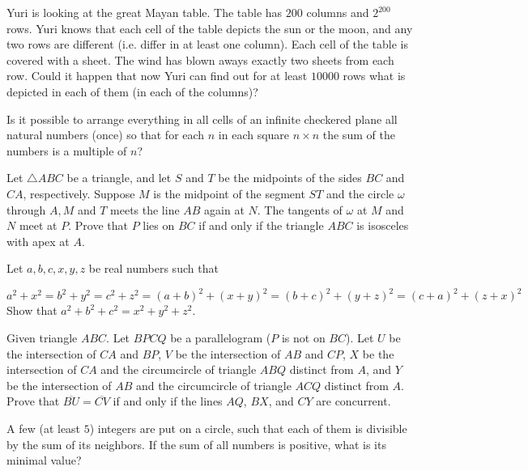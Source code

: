 \documentclass[11pt]{scrartcl}
\begin{document}
\begin{problem}[825542457780626]
Yuri is looking at the great Mayan table. The table has $200$ columns and $2^{200}$ rows. Yuri knows that each cell of the table depicts the sun or the moon, and any two rows are different (i.e. differ in at least one column). Each cell of the table is covered with a sheet. The wind has blown aways exactly two sheets from each row. Could it happen that now Yuri can find out for at least $10000$ rows what is depicted in each of them (in each of the columns)?
\end{problem}
\begin{problem}[3048608408918882691]
	Is it possible to arrange everything in all cells of an infinite checkered plane all natural numbers (once) so that for each $n$ in each square $n \times n$ the sum of the numbers is a multiple of $n$?
\end{problem}
\begin{problem}[8639636622304457736]
Let $\triangle ABC$ be a triangle, and let $S$ and $T$ be the midpoints of the sides $BC$ and $CA$, respectively. Suppose $M$ is the midpoint of the segment $ST$ and the circle $\omega$ through $A, M$ and $T$ meets the line $AB$ again at $N$. The tangents of $\omega$ at $M$ and $N$ meet at $P$. Prove that $P$ lies on $BC$ if and only if the triangle $ABC$ is isosceles with apex at $A$.
\end{problem}
\begin{problem}[8129091008921005997]
Let $a,b,c,x,y,z$ be real numbers such that

\[ a^2+x^2=b^2+y^2=c^2+z^2=(a+b)^2+(x+y)^2=(b+c)^2+(y+z)^2=(c+a)^2+(z+x)^2 \]
Show that $a^2+b^2+c^2=x^2+y^2+z^2$.
\end{problem}
\begin{problem}[302438226120877]
	Given triangle $ABC$. Let $BPCQ$ be a parallelogram ($P$ is not on $BC$). Let $U$ be the intersection of $CA$ and $BP$, $V$ be the intersection of $AB$ and $CP$, $X$ be the intersection of $CA$ and the circumcircle of triangle $ABQ$ distinct from $A$, and $Y$ be the intersection of $AB$ and the circumcircle of triangle $ACQ$ distinct from $A$.
Prove that $\overline{BU} = \overline{CV}$ if and only if the lines $AQ$, $BX$, and $CY$ are concurrent.
\end{problem}
\begin{problem}[616860610609120]
	A few (at least $5$) integers are put on a circle, such that each of them is divisible by the sum of its neighbors. If the sum of all numbers is positive, what is its minimal value?
\end{problem}
\end{document}
